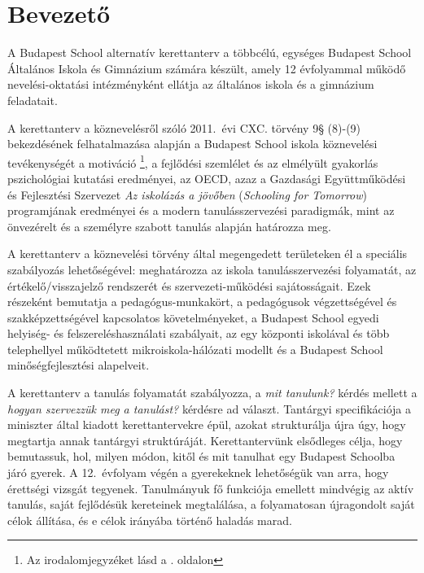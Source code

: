 \chapter{Bevezető}
A Budapest School alternatív kerettanterv a többcélú, egységes	Budapest School Általános Iskola és Gimnázium számára készült, amely 12 évfolyammal működő nevelési-oktatási intézményként ellátja az általános iskola és a gimnázium feladatait.

A kerettanterv a köznevelésről szóló 2011.~évi CXC. törvény 9§ (8)-(9) bekezdésének felhatalmazása alapján a Budapest School iskola köznevelési tevékenységét a motiváció \citep{pink2011drive}\footnote{Az irodalomjegyzéket lásd a \pageref{sec:bibliographyk}. oldalon}, a fejlődési szemlélet \citep{growthmindset} és az elmélyült gyakorlás \citep{ericsson2016peak} pszichológiai kutatási eredményei, az  OECD, azaz a Gazdasági Együttműködési és Fejlesztési Szervezet \emph{Az iskolázás a jövőben}  (\emph{Schooling for Tomorrow}) programjának eredményei \citep{2006schooling} és a modern tanulásszervezési paradigmák, mint az önvezérelt \citep{mitra2012beyond} és a személyre szabott \citep{khan2012one} tanulás alapján határozza meg.

A kerettanterv a köznevelési törvény által megengedett területeken él a speciális szabályozás lehetőségével: meghatározza az iskola tanulásszervezési folyamatát, az értékelő/visszajelző rendszerét és szervezeti-működési sajátosságait. Ezek részeként bemutatja a pedagógus-munkakört, a pedagógusok végzettségével és szakképzettségével kapcsolatos követelményeket, a Budapest School	egyedi helyiség- és felszereléshasználati szabályait, az egy központi iskolával és több telephellyel működtetett mikroiskola-hálózati modellt és a Budapest School minőségfejlesztési alapelveit.

A kerettanterv	a tanulás folyamatát szabályozza, a \emph{mit tanulunk?} kérdés mellett a \emph{hogyan szervezzük meg a tanulást?} kérdésre ad választ. Tantárgyi specifikációja a miniszter által kiadott kerettantervekre \citep{ofi:kerettanterv} épül, azokat strukturálja újra úgy, hogy megtartja annak tantárgyi struktúráját. Kerettantervünk elsődleges célja, hogy bemutassuk, hol, milyen módon, kitől és mit tanulhat egy Budapest Schoolba járó gyerek. A 12.~évfolyam végén a gyerekeknek lehetőségük van arra, hogy érettségi vizsgát tegyenek. Tanulmányuk fő funkciója emellett mindvégig az aktív tanulás, saját fejlődésük kereteinek megtalálása, a folyamatosan újragondolt saját célok állítása, és e célok irányába történő haladás marad.

